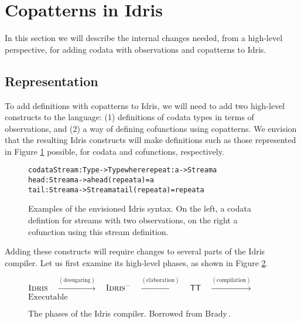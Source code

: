 \section{Copatterns in Idris}
\label{sec:copatterns_in_idris}
In this section we will describe the internal changes needed, from a high-level perspective, for adding codata with observations and copatterns to Idris.

\subsection{Representation}
To add definitions with copatterns to Idris, we will need to add two high-level constructs to the language: (1) definitions of codata types in terms of observations, and (2) a way of defining cofunctions using copatterns. We envision that the resulting Idris constructs will make definitions such as those represented in Figure \ref{fig:envisioned_copattern_syntax} possible, for codata and cofunctions, respectively.

\begin{figure}
\begin{alltt}
codata Stream : Type -> Type where             repeat : a -> Stream a
  head : Stream a -> a                         head (repeat a) = a
  tail : Stream a -> Stream a                  tail (repeat a) = repeat a
\end{alltt}
\caption{Examples of the envisioned Idris syntax. On the left, a codata defintion for streams with two observations, on the right a cofunction using this stream definition.}
\label{fig:envisioned_copattern_syntax}
\end{figure}

Adding these constructs will require changes to several parts of the Idris compiler. Let us first examine its high-level phases, as shown in Figure \ref{fig:Idris_compiler_phases}.

\begin{figure}
\begin{center}
$\mbox{\textsc{Idris}{}}$
$\;$
$\xrightarrow{\mathrm{ (desugaring) }}$
$\;$
$\mbox{\textsc{Idris}$^-${}}$
$\;$
$\xrightarrow{\mathrm{ (elaboration) }}$
$\;$
$\mbox{\textsf{TT}{}}$
$\;$
$\xrightarrow{\mathrm{ (compilation) }}$
$\;$
$\mbox{Executable}$
\end{center}
\caption{The phases of the Idris compiler. Borrowed from Brady\,\citep{BradyIdrisImpl13}.}
\label{fig:Idris_compiler_phases}
\end{figure}

